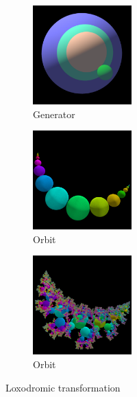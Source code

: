 \begin{figure}[h!tbp]

  \begin{subfigure}{0.24\textwidth}
   \begin{center}
    \includegraphics[width=1.5in, height=1.5in, keepaspectratio]{../img/klein/3diis/loxoGenSimple.pdf}
    \caption{Generator}
    \label{fig:loxoGen3d}
   \end{center}
  \end{subfigure}
 \hspace*{\fill}
  \begin{subfigure}{0.24\textwidth}
   \begin{center}
    \includegraphics[width=1.5in, height=1.5in, keepaspectratio]{../img/klein/3diis/loxoOrbSimple.pdf}
    \caption{Orbit}
    \label{fig:loxoOrb3d}
   \end{center}
  \end{subfigure}
 \hspace*{\fill}
 \begin{subfigure}{0.24\textwidth}
  \begin{center}
   \includegraphics[width=1.5in, height=1.5in, keepaspectratio]{../img/klein/3diis/loxoOrbSch.pdf}
   \caption{Orbit}
   \label{fig:loxoOrbSch3d}
  \end{center}
 \end{subfigure}

  \caption{Loxodromic transformation}
  \label{fig:loxodromic3d}

\end{figure}

